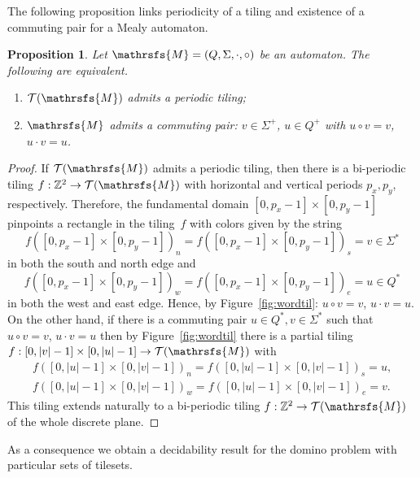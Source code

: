 \documentclass{amsart}
\newtheorem{proposition}[theorem]{Proposition}
\begin{document}
The following proposition links periodicity of a tiling and existence of a commuting pair for a Mealy automaton.
\begin{proposition}\label{prop: periodic tiling}
Let ${{{\mathrsfs{{M}}}}}=({{{Q}}},{{{\Sigma}}},{{{\cdot}}},{{{\circ}}})$ be an automaton. The following are equivalent.
\begin{enumerate}[label=(\roman{enumi})]
\item $\mathcal{T}({{{\mathrsfs{{M}}}}})$ admits a periodic tiling;
\item ${{{\mathrsfs{{M}}}}}$ admits a commuting pair: $v\in {{{\Sigma}}}^{+}$, $u\in {{{Q}}}^{+}$ with $u{{{\circ}}} v=v$, $u{{{\cdot}}} v=u$.
\end{enumerate}
\end{proposition}
\begin{proof}
If $\mathcal{T}({{{\mathrsfs{{M}}}}})$ admits a periodic tiling, then there is a bi-periodic tiling $f: \mathbb{Z}^{2}\rightarrow \mathcal{T}({{{\mathrsfs{{M}}}}})$
with horizontal and vertical periods $p_{x}, p_{y}$, respectively.
Therefore, the fundamental domain $[0, p_{x}-1]\times [0,p_{y}-1]$ pinpoints a rectangle in the tiling~$f$ with colors given by the string
\[f\left([0, p_{x}-1]\times [0,p_{y}-1]\right)_{n}=f\left([0, p_{x}-1]\times [0,p_{y}-1]\right)_{s}=v\in {{{\Sigma}}}^{*}\]
in both the south and north edge and
\[f\left([0, p_{x}-1]\times [0,p_{y}-1]\right)_{w}=f\left([0, p_{x}-1]\times [0,p_{y}-1]\right)_{e}=u\in {{{Q}}}^{*}\]
in both the west and east edge. Hence, by Figure~\ref{fig:wordtil}: $u{{{\circ}}} v=v$, $u{{{\cdot}}} v=u$.
On the other hand, if there is a commuting pair $u\in {{{Q}}}^{*},v\in {{{\Sigma}}}^{*}$ such that $u{{{\circ}}} v=v$,
$u{{{\cdot}}} v=u$ then by Figure~\ref{fig:wordtil}
there is a partial tiling $f:[0,|v|-1]\times [0,|u|-1]\rightarrow \mathcal{T}({{{\mathrsfs{{M}}}}})$ with
\[\begin{array}{c}
f\left([0, |u|-1]\times [0,|v|-1]\right)_{n}=f\left([0, |u|-1]\times [0,|v|-1]\right)_{s}=u,\\
f\left([0, |u|-1]\times [0,|v|-1]\right)_{w}=f\left([0, |u|-1]\times [0,|v|-1]\right)_{e}=v.
\end{array}\]
This tiling extends naturally to a bi-periodic tiling $f:\mathbb{Z}^{2}\rightarrow \mathcal{T}({{{\mathrsfs{{M}}}}})$ of the whole discrete plane.
\end{proof}

As a consequence we obtain a decidability result for the domino problem with  particular sets of tilesets.\medskip
\end{document}
